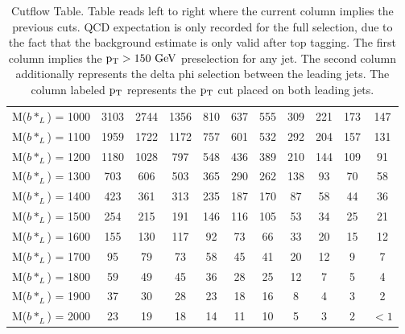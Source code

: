 \begin{table}
\begin{center}
\begin{small}
\begin{tabular}{c||c|c|c|c|c|c|c|c|c|c}
M($b*_{L}$) = 1000 & 3103 & 2744 & 1356 & 810 & 637 & 555 & 309 & 221 & 173 & 147\\ 
M($b*_{L}$) = 1100 & 1959 & 1722 & 1172 & 757 & 601 & 532 & 292 & 204 & 157 & 131\\ 
M($b*_{L}$) = 1200 & 1180 & 1028 & 797 & 548 & 436 & 389 & 210 & 144 & 109 & 91\\ 
M($b*_{L}$) = 1300 & 703 & 606 & 503 & 365 & 290 & 262 & 138 & 93 & 70 & 58\\ 
M($b*_{L}$) = 1400 & 423 & 361 & 313 & 235 & 187 & 170 & 87 & 58 & 44 & 36\\ 
M($b*_{L}$) = 1500 & 254 & 215 & 191 & 146 & 116 & 105 & 53 & 34 & 25 & 21\\ 
M($b*_{L}$) = 1600 & 155 & 130 & 117 & 92 & 73 & 66 & 33 & 20 & 15 & 12\\ 
M($b*_{L}$) = 1700 & 95 & 79 & 73 & 58 & 45 & 41 & 20 & 12 & 9 & 7\\ 
M($b*_{L}$) = 1800 & 59 & 49 & 45 & 36 & 28 & 25 & 12 & 7 & 5 & 4\\ 
M($b*_{L}$) = 1900 & 37 & 30 & 28 & 23 & 18 & 16 & 8 & 4 & 3 & 2\\ 
M($b*_{L}$) = 2000 & 23 & 19 & 18 & 14 & 11 & 10 & 5 & 3 & 2 & $<1$\\ 
\hline

\end{tabular}
\caption{Cutflow Table.  Table reads left to right where the current column implies the previous cuts.  QCD expectation is only recorded for the full selection, 
due to the fact that the background estimate is only valid after top tagging.  The first column implies the $\mathrm{p_{T}}>150~\mathrm{GeV}$ preselection for any jet.  The second column additionally represents the delta phi selection between the leading jets.  
The column labeled $\mathrm{p_{T}}$ represents the $\mathrm{p_{T}}$ cut placed on both leading jets.}
\label{table:bsCutflow}
\end{small}
\end{center}
\end{table}


